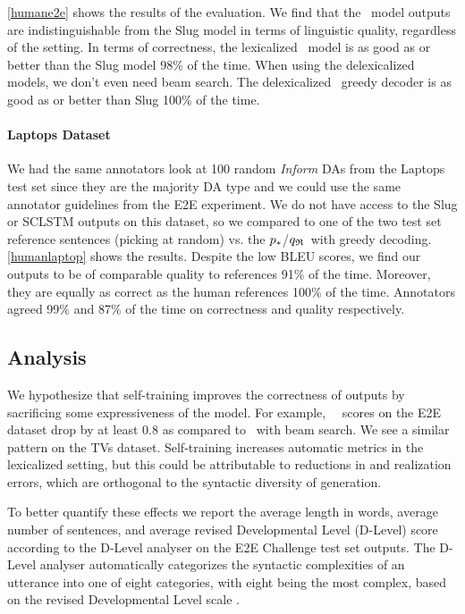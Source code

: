 \autoref{humane2e} shows the results of the evaluation.  We find that the
\auggen~model outputs are indistinguishable from the Slug model in terms of
linguistic quality, regardless of the setting.  In terms of correctness, the
lexicalized \auggen~model is as good as or better than the Slug model 98\% of
the time.  When using the delexicalized models, we don't even need beam search.
The delexicalized \auggen~greedy decoder is as good as or better than Slug
100\% of the time.



\paragraph{Laptops Dataset} We had the same annotators look at 100 random
\textit{Inform} DAs from the Laptops test set since they are the majority DA
type and we could use the same annotator guidelines from the E2E experiment. We
do not have access to the Slug or SCLSTM outputs on this dataset, so we
compared to one of the two test set reference sentences (picking at random) vs.
the $p_*$/${q_{\mathfrak{R}} }$~with greedy decoding. \autoref{humanlaptop} shows
the results. Despite the low BLEU scores, we find our outputs to be of
comparable quality to references 91\% of the time. Moreover, they are equally
as correct as the human references 100\% of the time.  Annotators agreed 99\%
and 87\% of the time on correctness and quality respectively.

\subsection{Analysis}

We hypothesize that self-training improves the correctness of outputs by
sacrificing some expressiveness of the model. For example, \auggen~\bleu~scores
on the E2E dataset drop by at least 0.8 as compared to \basegen~with beam
search. We see a similar pattern on the TVs dataset. Self-training increases
automatic metrics in the lexicalized setting, but this could be attributable to
reductions  in  and  realization errors, which are
orthogonal to the syntactic diversity of generation.

To better quantify these effects we report the average length in words, average
number of sentences, and average revised Developmental Level (D-Level) score
according to the D-Level analyser \citep{lu2009automatic} on the E2E Challenge
test set outputs.  The D-Level analyser automatically categorizes the syntactic
complexities of an utterance into one of eight categories, with eight being the
most complex, based on the revised Developmental Level scale
\citep{rosenberg1987indicators,covington2006complex}.

